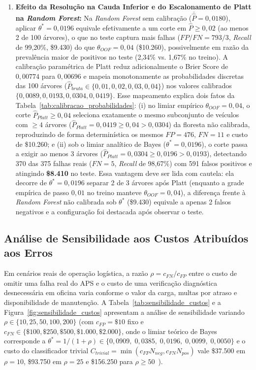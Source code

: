\documentclass[conference]{IEEEtran}
\begin{document}
\begin{enumerate}
    \item \textbf{Efeito da Resolução na Cauda Inferior e do Escalonamento de Platt na \textit{Random Forest}:} Na \textit{Random Forest} sem calibração ($\bar{\hat{P}} = 0{,}0180$), aplicar $\theta^* = 0{,}0196$ equivale efetivamente a um corte em $\hat{P} \ge 0{,}02$ (ao menos 2 de 100 árvores), o que no teste captura mais falhas ($FP/FN = 793/3$, \textit{Recall} de 99,20\%, \$9.430) do que $\theta_{OOF} = 0{,}04$ (\$10.260), possivelmente em razão da prevalência maior de positivos no teste (2,34\% vs. 1,67\% no treino). A calibração paramétrica de Platt reduz adicionalmente o Brier Score de $0{,}00774$ para $0{,}00696$ e mapeia monotonamente as probabilidades discretas das 100 árvores ($\hat{P}_{bruta} \in \{0{,}01, 0{,}02, 0{,}03, 0{,}04\}$) nos valores calibrados $\{0{,}0089, 0{,}0193, 0{,}0304, 0{,}0419\}$. Esse mapeamento explica dois fatos da Tabela~\ref{tab:calibracao_probabilidades}: (i) no limiar empírico $\theta_{OOF} = 0{,}04$, o corte $\hat{P}_{Platt} \ge 0{,}04$ seleciona exatamente o mesmo subconjunto de veículos com $\ge 4$ árvores ($\hat{P}_{Platt} = 0{,}0419 \ge 0{,}04 > 0{,}0304$) da floresta não calibrada, reproduzindo de forma determinística os mesmos $FP = 476$, $FN = 11$ e custo de \$10.260; e (ii) sob o limiar analítico de Bayes ($\theta^* = 0{,}0196$), o corte passa a exigir ao menos 3 árvores ($\hat{P}_{Platt} = 0{,}0304 \ge 0{,}0196 > 0{,}0193$), detectando 370 das 375 falhas reais ($FN = 5$, \textit{Recall} de 98,67\%) com 591 falsos positivos e atingindo \textbf{\$8.410} no teste. Essa vantagem deve ser lida com cautela: ela decorre de $\theta^* = 0{,}0196$ separar 2 de 3 árvores após Platt (enquanto a grade empírica de passo $0{,}01$ no treino manteve $\theta_{OOF} = 0{,}04$), a diferença frente à \textit{Random Forest} não calibrada sob $\theta^*$ (\$9.430) equivale a apenas 2 falsos negativos e a configuração foi destacada após observar o teste.
\end{enumerate}

\subsection{Análise de Sensibilidade aos Custos Atribuídos aos Erros}

Em cenários reais de operação logística, a razão $\rho = c_{FN}/c_{FP}$ entre o custo de omitir uma falha real do APS e o custo de uma verificação diagnóstica desnecessária em oficina varia conforme o valor da carga, multas por atraso e disponibilidade de manutenção. A Tabela~\ref{tab:sensibilidade_custos} e a Figura~\ref{fig:sensibilidade_custos} apresentam a análise de sensibilidade variando $\rho \in \{10, 25, 50, 100, 200\}$ (com $c_{FP} = \$10$ fixo e $c_{FN} \in \{\$100, \$250, \$500, \$1.000, \$2.000\}$, onde o limiar teórico de Bayes corresponde a $\theta^* = 1/(1+\rho) \in \{0{,}0909,\; 0{,}0385,\; 0{,}0196,\; 0{,}0099,\; 0{,}0050\}$ e o custo do classificador trivial $C_{trivial} = \min(c_{FP} N_{neg}, c_{FN} N_{pos})$ vale \$37.500 em $\rho=10$, \$93.750 em $\rho=25$ e \$156.250 para $\rho \ge 50$~\cite{drummond2006cost}).
\end{document}
